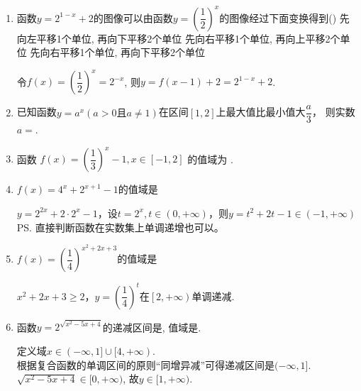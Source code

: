 \begin{enumerate}
    \item 函数$y=2^{1-x}+2$的图像可以由函数$y=\left(\dfrac{1}{2}\right)^x$的图像经过下面变换得到\dotfill()
    {先向左平移1个单位, 再向下平移2个单位}
    {先向右平移1个单位, 再向上平移2个单位}
    {先向右平移1个单位, 再向下平移2个单位}
    \begin{jieda}
    令$f(x)=\left(\dfrac{1}{2}\right)^x=2^{-x}$, 则$y=f(x-1)+2=2^{1-x}+2$.
    \end{jieda}
    \item 已知函数$y = a^x (a > 0 \mbox{且} a \neq 1)$在区间$[1, 2]$上最大值比最小值大$\dfrac{a}{3}$， 则实数$a = $.
    \begin{jieda}
    \end{jieda}
    \item 函数 $f(x)=\left(\dfrac{1}{3}\right)^x-1, x \in[-1,2]$ 的值域为 .
    \item $f(x) = 4^x + 2^{x+1} - 1$的值域是
    \begin{jieda}
        $y = 2^{2x} + 2 \cdot 2^x - 1$，设$t = 2^x, t \in (0, +\infty)$，则$y = t^2 + 2t - 1 \in (-1, +\infty)$ \\
        \ps 直接判断函数在实数集上单调递增也可以。
    \end{jieda}

    \item $f(x) = \left(\dfrac{1}{4}\right)^{x^2+2x+3}$的值域是\blkda{$\left(0, \dfrac{1}{16}\right]$}
    \begin{jieda}
        $x^2+2x+3 \geq 2$，$y = \left(\dfrac{1}{4}\right)^{t}$在$\left[2, +\infty\right)$单调递减.
    \end{jieda}
    \item 函数$y=2^{\sqrt{x^2-5x+4}}$的递减区间是\blkda{$(-\infty,1]$}, 值域是\blkda{$[1,+\infty)$}. 
    \begin{jieda}
    定义域$x\in(-\infty,1]\cup[4,+\infty)$. \\
    根据复合函数的单调区间的原则``同增异减''可得递减区间是$(-\infty,1]$. \\
    $\sqrt{x^2-5x+4}\in[0,+\infty)$, 故$y\in[1,+\infty)$. 
    \end{jieda}
    

\end{enumerate}

